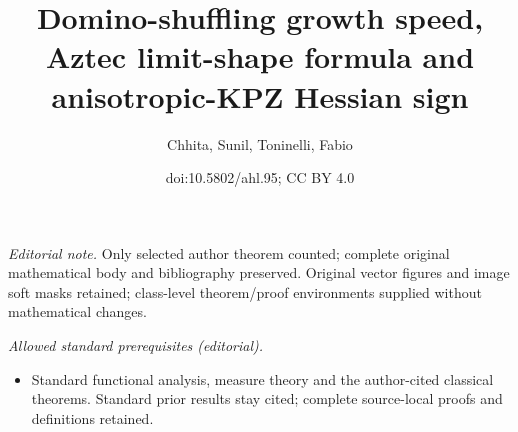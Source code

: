 \documentclass[10pt]{amsart}
\title{Domino-shuffling growth speed, Aztec limit-shape formula and anisotropic-KPZ Hessian sign}
\author{Chhita, Sunil, Toninelli, Fabio}
\date{doi:10.5802/ahl.95; CC BY 4.0}
\theoremstyle{definition}\newtheorem{defi}[theo]{Definition}\newtheorem{rema}[theo]{Remark}\newtheorem{exam}[theo]{Example}\newtheorem{exem}[theo]{Example}\newtheorem{nota}[theo]{Notation}
\begin{document}
\maketitle
\noindent\textit{Editorial note.} Only selected author theorem counted; complete original mathematical body and bibliography preserved. Original vector figures and image soft masks retained; class-level theorem/proof environments supplied without mathematical changes.\par\medskip
\noindent\textit{Allowed standard prerequisites (editorial).}\begin{itemize}
\item Standard functional analysis, measure theory and the author-cited classical theorems. Standard prior results stay cited; complete source-local proofs and definitions retained.
\end{itemize}\medskip
\end{document}
